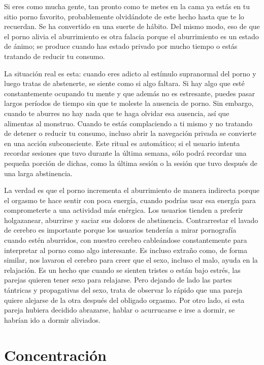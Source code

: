 \documentclass[
  spanish,
  openany]{book}
\begin{document}
Si eres como mucha gente, tan pronto como te metes en la cama ya estás en tu sitio porno favorito, probablemente olvidándote de este hecho hasta que te lo recuerdan. Se ha convertido en una suerte de hábito. Del mismo modo, eso de que el porno alivia el aburrimiento es otra falacia porque el aburrimiento es un estado de ánimo; se produce cuando has estado privado por mucho tiempo o estás tratando de reducir tu consumo.

La situación real es esta: cuando eres adicto al estímulo supranormal del porno y luego tratas de abstenerte, se siente como si algo faltara. Si hay algo que esté constantemente ocupando tu mente y que además no es estresante, puedes pasar largos períodos de tiempo sin que te moleste la ausencia de porno. Sin embargo, cuando te aburres no hay nada que te haga olvidar esa ausencia, así que alimentas al monstruo. Cuando te estás complaciendo a ti mismo y no tratando de detener o reducir tu consumo, incluso abrir la navegación privada se convierte en una acción subconsciente. Este ritual es automático; si el usuario intenta recordar sesiones que tuvo durante la última semana, sólo podrá recordar una pequeña porción de dichas, como la última sesión o la sesión que tuvo después de una larga abstinencia.

La verdad es que el porno incrementa el aburrimiento de manera indirecta porque el orgasmo te hace sentir con poca energía, cuando podrías usar esa energía para comprometerte a una actividad más enérgica. Los usuarios tienden a preferir holgazanear, aburrirse y saciar sus dolores de abstinencia. Contrarrestar el lavado de cerebro es importante porque los usuarios tenderán a mirar pornografía cuando estén aburridos, con nuestro cerebro cableándose constantemente para interpretar al porno como algo interesante. Es incluso extraño como, de forma similar, nos lavaron el cerebro para creer que el sexo, incluso el malo, ayuda en la relajación. Es un hecho que cuando se sienten tristes o están bajo estrés, las parejas quieren tener sexo para relajarse. Pero dejando de lado las partes tántricas y propagativas del sexo, trata de observar lo rápido que una pareja quiere alejarse de la otra después del obligado orgasmo. Por otro lado, si esta pareja hubiera decidido abrazarse, hablar o acurrucarse e irse a dormir, se habrían ido a dormir aliviados.

\hypertarget{concentraciuxf3n}{%
\section{Concentración}\label{concentraciuxf3n}}
\end{document}
